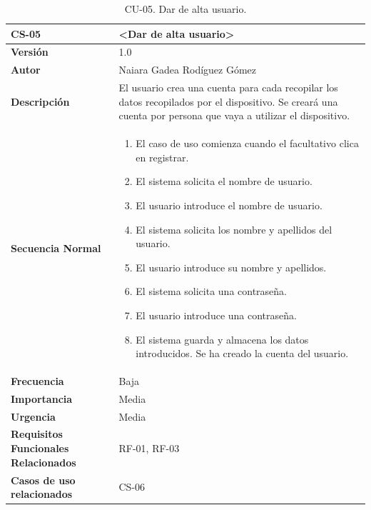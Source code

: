 \begin{table}[h!]
\centering
\begin{tabular}{ |m{3cm}|m{11cm}|  } 
\hline
\cellcolor[HTML]{B9E3F0}\textbf{CS-05} & \cellcolor[HTML]{B9E3F0}\textbf{<Dar de alta usuario>}\\

\hline
\cellcolor[HTML]{EFEFEF}\textbf{Versión}             & 1.0  \\
\hline
\cellcolor[HTML]{EFEFEF}\textbf{Autor}                & Naiara Gadea Rodíguez Gómez\\
\hline
\cellcolor[HTML]{EFEFEF}\textbf{Descripción}                & {El usuario crea una cuenta para cada recopilar los datos recopilados por el dispositivo. Se creará una cuenta por persona que vaya a utilizar el dispositivo.}\\
\hline
\cellcolor[HTML]{EFEFEF}\textbf{Secuencia \newline Normal}                &                 
        \begin{enumerate}
			\def\labelenumi{\arabic{enumi}.}
			\tightlist
			\item El caso de uso comienza cuando el facultativo clica en registrar.
			\item El sistema solicita el nombre de usuario. 
                \item El usuario introduce el nombre de usuario.
                \item El sistema solicita los nombre y apellidos del usuario.
                \item El usuario introduce su nombre y apellidos.
                \item El sistema solicita una contraseña. 
                \item El usuario introduce una contraseña. 
                \item El sistema guarda y almacena los datos introducidos. Se ha creado la cuenta del usuario. 
		\end{enumerate}\\
\hline
\cellcolor[HTML]{EFEFEF}\textbf{Frecuencia}                & Baja\\
\hline
\cellcolor[HTML]{EFEFEF}\textbf{Importancia}                & Media\\
\hline
\cellcolor[HTML]{EFEFEF}\textbf{Urgencia}                & Media\\
\hline
\cellcolor[HTML]{EFEFEF}\textbf{Requisitos Funcionales Relacionados}                & {RF-01, RF-03 }\\
\hline
\cellcolor[HTML]{EFEFEF}\textbf{Casos de uso relacionados}                & {CS-06}\\
\hline
\end{tabular}
\caption{CU-05. Dar de alta usuario.}
\end{table}

